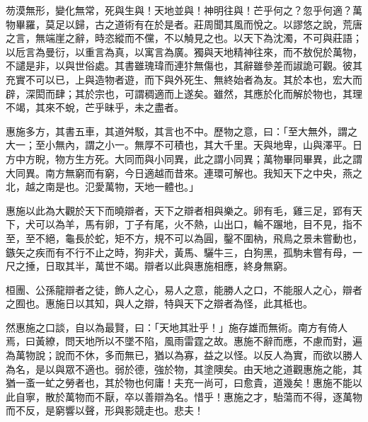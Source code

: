 \begin{pinyinscope}
芴漠無形，變化無常，死與生與！天地並與！神明往與！芒乎何之？忽乎何適？萬物畢羅，莫足以歸，古之道術有在於是者。莊周聞其風而悅之。以謬悠之說，荒唐之言，無端崖之辭，時恣縱而不儻，不以觭見之也。以天下為沈濁，不可與莊語；以卮言為曼衍，以重言為真，以寓言為廣。獨與天地精神往來，而不敖倪於萬物，不譴是非，以與世俗處。其書雖瑰瑋而連犿無傷也，其辭雖參差而諔詭可觀。彼其充實不可以已，上與造物者遊，而下與外死生、無終始者為友。其於本也，宏大而辟，深閎而肆；其於宗也，可謂稠適而上遂矣。雖然，其應於化而解於物也，其理不竭，其來不蛻，芒乎昧乎，未之盡者。

惠施多方，其書五車，其道舛駁，其言也不中。歷物之意，曰：「至大無外，謂之大一；至小無內，謂之小一。無厚不可積也，其大千里。天與地卑，山與澤平。日方中方睨，物方生方死。大同而與小同異，此之謂小同異；萬物畢同畢異，此之謂大同異。南方無窮而有窮，今日適越而昔來。連環可解也。我知天下之中央，燕之北，越之南是也。氾愛萬物，天地一體也。」

惠施以此為大觀於天下而曉辯者，天下之辯者相與樂之。卵有毛，雞三足，郢有天下，犬可以為羊，馬有卵，丁子有尾，火不熱，山出口，輪不蹍地，目不見，指不至，至不絕，龜長於蛇，矩不方，規不可以為圓，鑿不圍枘，飛鳥之景未嘗動也，鏃矢之疾而有不行不止之時，狗非犬，黃馬、驪牛三，白狗黑，孤駒未嘗有母，一尺之捶，日取其半，萬世不竭。辯者以此與惠施相應，終身無窮。

桓團、公孫龍辯者之徒，飾人之心，易人之意，能勝人之口，不能服人之心，辯者之囿也。惠施日以其知，與人之辯，特與天下之辯者為怪，此其柢也。

然惠施之口談，自以為最賢，曰：「天地其壯乎！」施存雄而無術。南方有倚人焉，曰黃繚，問天地所以不墜不陷，風雨雷霆之故。惠施不辭而應，不慮而對，遍為萬物說；說而不休，多而無已，猶以為寡，益之以怪。以反人為實，而欲以勝人為名，是以與眾不適也。弱於德，強於物，其塗隩矣。由天地之道觀惠施之能，其猶一蚉一虻之勞者也，其於物也何庸！夫充一尚可，曰愈貴，道幾矣！惠施不能以此自寧，散於萬物而不厭，卒以善辯為名。惜乎！惠施之才，駘蕩而不得，逐萬物而不反，是窮響以聲，形與影競走也。悲夫！


\end{pinyinscope}